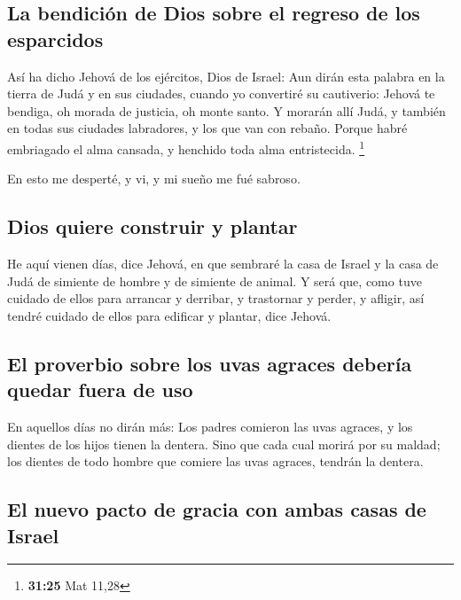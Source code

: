 \hypertarget{la-bendiciuxf3n-de-dios-sobre-el-regreso-de-los-esparcidos}{%
\subsection{La bendición de Dios sobre el regreso de los
esparcidos}\label{la-bendiciuxf3n-de-dios-sobre-el-regreso-de-los-esparcidos}}

 Así ha dicho Jehová de los ejércitos, Dios de Israel: Aun
dirán esta palabra en la tierra de Judá y en sus ciudades, cuando yo
convertiré su cautiverio: Jehová te bendiga, oh morada de justicia, oh
monte santo.  Y morarán allí Judá, y también en todas sus
ciudades labradores, y los que van con rebaño.  Porque
habré embriagado el alma cansada, y henchido toda alma entristecida.
\footnote{\textbf{31:25} Mat 11,28}

 En esto me desperté, y vi, y mi sueño me fué sabroso.

\hypertarget{dios-quiere-construir-y-plantar}{%
\subsection{Dios quiere construir y
plantar}\label{dios-quiere-construir-y-plantar}}

 He aquí vienen días, dice Jehová, en que sembraré la casa
de Israel y la casa de Judá de simiente de hombre y de simiente de
animal.  Y será que, como tuve cuidado de ellos para
arrancar y derribar, y trastornar y perder, y afligir, así tendré
cuidado de ellos para edificar y plantar, dice Jehová.

\hypertarget{el-proverbio-sobre-los-uvas-agraces-deberuxeda-quedar-fuera-de-uso}{%
\subsection{El proverbio sobre los uvas agraces debería quedar fuera de
uso}\label{el-proverbio-sobre-los-uvas-agraces-deberuxeda-quedar-fuera-de-uso}}

 En aquellos días no dirán más: Los padres comieron las
uvas agraces, y los dientes de los hijos tienen la dentera.
 Sino que cada cual morirá por su maldad; los dientes de
todo hombre que comiere las uvas agraces, tendrán la dentera.

\hypertarget{el-nuevo-pacto-de-gracia-con-ambas-casas-de-israel}{%
\subsection{El nuevo pacto de gracia con ambas casas de
Israel}\label{el-nuevo-pacto-de-gracia-con-ambas-casas-de-israel}}


